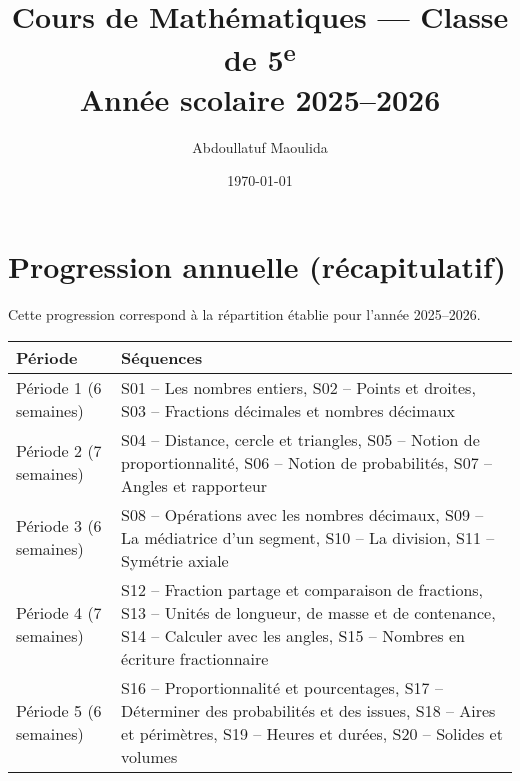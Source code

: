 \documentclass[12pt,a4paper]{book}
\title{Cours de Mathématiques — Classe de 5\textsuperscript{e}\\[0.4em]\large Année scolaire 2025–2026}
\author{Abdoullatuf Maoulida}
\date{\today}
\begin{document}
\maketitle
\tableofcontents
\cleardoublepage


\cleardoublepage
\appendix
\chapter{Progression annuelle (récapitulatif)}
Cette progression correspond à la répartition établie pour l'année 2025–2026.

\begin{center}
\begin{tabular}{|l|l|}
\hline
\textbf{Période} & \textbf{Séquences}\\ \hline
Période 1 (6 semaines) & S01 -- Les nombres entiers, S02 -- Points et droites, S03 -- Fractions décimales et nombres décimaux\\ \hline
Période 2 (7 semaines) & S04 -- Distance, cercle et triangles, S05 -- Notion de proportionnalité, S06 -- Notion de probabilités, S07 -- Angles et rapporteur\\ \hline
Période 3 (6 semaines) & S08 -- Opérations avec les nombres décimaux, S09 -- La médiatrice d'un segment, S10 -- La division, S11 -- Symétrie axiale\\ \hline
Période 4 (7 semaines) & S12 -- Fraction partage et comparaison de fractions, S13 -- Unités de longueur, de masse et de contenance, S14 -- Calculer avec les angles, S15 -- Nombres en écriture fractionnaire\\ \hline
Période 5 (6 semaines) & S16 -- Proportionnalité et pourcentages, S17 -- Déterminer des probabilités et des issues, S18 -- Aires et périmètres, S19 -- Heures et durées, S20 -- Solides et volumes\\ \hline
\end{tabular}
\end{center}
\end{document}
